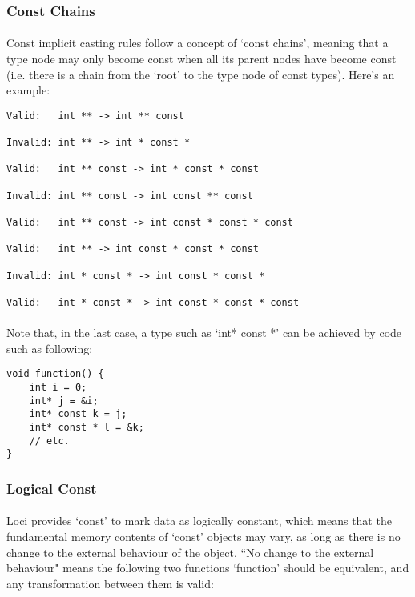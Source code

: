 \documentclass[12pt,twoside,notitlepage]{report}
\begin{document}
\subsubsection{Const Chains}

\paragraph{}
Const implicit casting rules follow a concept of `const chains', meaning that a type node may only become const when all its parent nodes have become const (i.e. there is a chain from the `root' to the type node of const types). Here's an example:

\begin{lstlisting}
Valid:   int ** -> int ** const

Invalid: int ** -> int * const *

Valid:   int ** const -> int * const * const

Invalid: int ** const -> int const ** const

Valid:   int ** const -> int const * const * const

Valid:   int ** -> int const * const * const

Invalid: int * const * -> int const * const *

Valid:   int * const * -> int const * const * const
\end{lstlisting}

\paragraph{}
Note that, in the last case, a type such as `int* const *' can be achieved by code such as following:

\begin{lstlisting}
void function() {
	int i = 0;
	int* j = &i;
	int* const k = j;
	int* const * l = &k;
	// etc.
}
\end{lstlisting}

\subsubsection{Logical Const}

\paragraph{}
Loci provides `const' to mark data as logically constant, which means that the fundamental memory contents of `const' objects may vary, as long as there is no change to the external behaviour of the object. ``No change to the external behaviour" means the following two functions `function' should be equivalent, and any transformation between them is valid:
\end{document}
